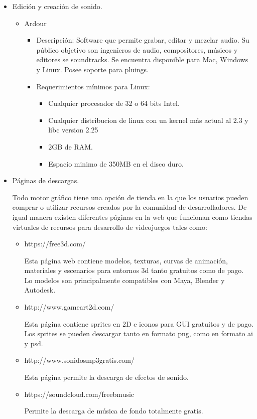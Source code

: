 \begin{itemize}
		\item Edición y creación de sonido.
			\begin{itemize}
				\item Ardour
					\begin{itemize}
						\item Descripción: Software que permite grabar, editar y mezclar audio. Su público objetivo son ingenieros de audio, compositores, músicos y editores se soundtracks. Se encuentra disponible para Mac, Windows y Linux. Posee soporte para pluings.
						\item Requerimientos mínimos para Linux:
						\begin{itemize}
							\item Cualquier procesador de 32 o 64 bits Intel.
							\item Cualquier distribucion de linux con un kernel más actual al 2.3 y libc version 2.25 
							\item 2GB de RAM.
							\item Espacio minimo de 350MB en el disco duro.

						\end{itemize}
					\end{itemize}
			\end{itemize}
		\item Páginas de descargas.
		\\
		\par
		Todo motor gráfico tiene una opción de tienda en la que los usuarios pueden comprar o utilizar recursos creados por la comunidad de desarrolladores. De igual manera existen diferentes páginas en la web que funcionan como tiendas virtuales de recursos para desarrollo de videojuegos tales como: 
		\begin{itemize}
			\item https://free3d.com/
			\\
			\par
Esta página web contiene modelos, texturas, curvas de animación, materiales y escenarios para entornos 3d tanto gratuitos como de pago. Lo modelos son principalmente compatibles con Maya, Blender y Autodesk.
			\item http://www.gameart2d.com/
			\\
			\par
Esta página contiene sprites en 2D e iconos para GUI gratuitos y de pago. Los sprites se pueden descargar tanto en formato png, como en formato ai y psd.
			\item http://www.sonidosmp3gratis.com/
			\\
			\par
Esta página permite la descarga de efectos de sonido. 
			\item https://soundcloud.com/freebmusic
			\\
			\par
Permite la descarga de música de fondo totalmente gratis.
		\end{itemize}
	\end{itemize}